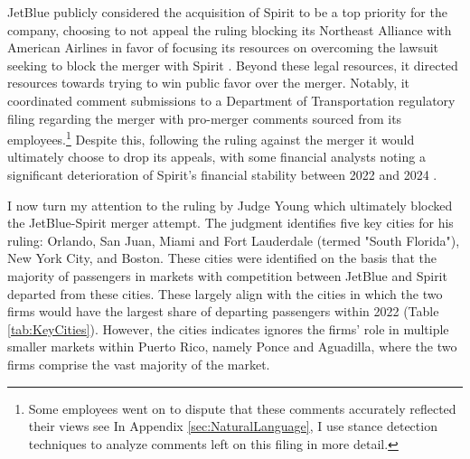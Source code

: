 \documentclass{article}
\begin{document}
	JetBlue publicly considered the acquisition of Spirit to be a top priority for the company, choosing to not appeal the ruling blocking its Northeast Alliance with American Airlines in favor of focusing its resources on overcoming the lawsuit seeking to block the merger with Spirit \citep{aratani_jetblue_2023}. Beyond these legal resources, it directed resources towards trying to win public favor over the merger. Notably, it coordinated comment submissions to a Department of Transportation regulatory filing regarding the merger with pro-merger comments sourced from its employees.\footnote{Some employees went on to dispute that these comments accurately reflected their views see \citet{birnbaum_elizabeth_2023, birnbaum_jet-blue_2023} In Appendix \ref{sec:NaturalLanguage}, I use stance detection techniques to analyze comments left on this filing in more detail.} Despite this, following the ruling against the merger it would ultimately choose to drop its appeals, with some financial analysts noting a significant deterioration of Spirit's financial stability between 2022 and 2024 \citep{sider_jetblue_2024}. 
	
	I now turn my attention to the ruling by Judge Young which ultimately blocked the JetBlue-Spirit merger attempt. The judgment identifies five key cities for his ruling: Orlando, San Juan, Miami and Fort Lauderdale (termed "South Florida"), New York City, and Boston. These cities were identified on the basis that the majority of passengers in markets with competition between JetBlue and Spirit departed from these cities. These largely align with the cities in which the two firms would have the largest share of departing passengers within 2022 (Table \ref{tab:KeyCities}). However, the cities indicates ignores the firms' role in multiple smaller markets within Puerto Rico, namely Ponce and Aguadilla, where the two firms comprise the vast majority of the market. 
	
\end{document}
